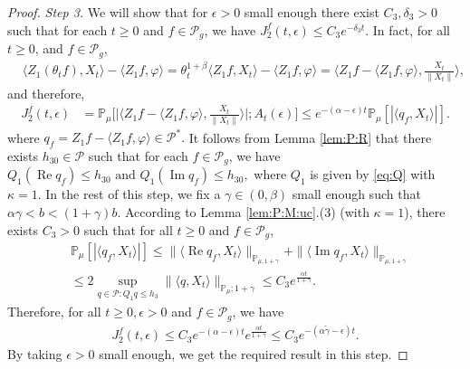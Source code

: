 \documentclass[12pt,a4paper]{amsart}
\theoremstyle{plain}
\theoremstyle{definition}
\numberwithin{equation}{section}
\begin{document}
\begin{proof}
\emph{Step 3.}
We will show that for $\epsilon>0$ small enough there exist $C_3, \delta_3 > 0$ such that for each $t \geq 0$ and $f\in \mathcal P_g$,  we have $ J^f_2(t,\epsilon) \leq C_3 e^{-\delta_3 t}$.
In fact, for all $t\geq 0$, and $f\in \mathcal P_g$,
\begin{align}
  & \langle Z_1(\theta_t f),X_{t}\rangle- \langle Z_1f, \varphi\rangle
     = \theta_t^{1+\beta} \langle Z_1 f,X_t\rangle - \langle  Z_1 f,\varphi \rangle
     =\Big\langle Z_1f - \langle  Z_1 f ,\varphi \rangle, \frac{X_{t}}{\|X_{t}\|}\Big\rangle,
\end{align}
and therefore,
\begin{align}
  \label{eq: prevJ2}
  J^f_2(t,\epsilon)
  & = \mathbb P_\mu\Big[\Big| \Big\langle Z_1f - \langle  Z_1 f ,\varphi \rangle, \frac{X_t}{\|X_t\|}\Big\rangle \Big|;A_t(\epsilon)\Big]
   \leq e^{-(\alpha-\epsilon)t} \mathbb{P}_{\mu}[| \langle q_f,X_t \rangle |].
\end{align}
where
\(
  q_f
  = Z_1 f-\langle  Z_1 f,\varphi\rangle \in \mathcal P^*.
\)
It follows from Lemma \ref{lem:P:R} that there exists $h_{30}\in \mathcal{P}$ such that for each $ f\in \mathcal P_g$, we have
\(
  Q_1 (\operatorname{Re} q_f) \leq h_{30}
  \text{ and } Q_1 (\operatorname{Im} q_f)\leq h_{30},
\)
where $Q_1$ is given by \eqref{eq:Q} with $\kappa=1$.
In the rest of this step, we  fix a $\gamma\in(0,\beta)$ small enough such that $\alpha \gamma < b < (1+\gamma)b$.
According to Lemma \ref{lem:P:M:uc}.(3) (with $\kappa=1$),
there exists $C_{3}>0$ such that for all $t\geq 0$ and $f\in \mathcal P_g$,
\begin{align}
  & \mathbb{P}_{\mu}\left[\left|\langle q_f,X_{t}\rangle\right|\right]
    \leq \|\langle \operatorname{Re} q_f, X_{t}\rangle\|_{\mathbb{P}_{\mu,1+\gamma}} + \|\langle \operatorname{Im} q_f, X_{t}\rangle\|_{\mathbb{P}_{\mu,1+\gamma}} \\
 & \leq 2\sup_{q\in \mathcal P: Q_1 q\leq h_{3}} \|\langle q, X_t\rangle\|_{\mathbb P_\mu; 1+\gamma} \leq C_{3} e^{\frac{\alpha t}{1+\gamma}}.
\end{align}
Therefore, for all $t\geq 0, \epsilon > 0$ and $f \in \mathcal P_g$, we have
\begin{align}
  \label{eq: right bound for J2}
   J^f_2(t, \epsilon)
    \leq  C_3 e^{-(\alpha-\epsilon)t}e^{\frac{\alpha t}{1+\gamma}}
   \leq C_{3} e^{-(\alpha\tilde \gamma -\epsilon)t}.
\end{align}
By taking $\epsilon >0$ small enough, we get the required result in this step.


\end{proof}
\end{document}
